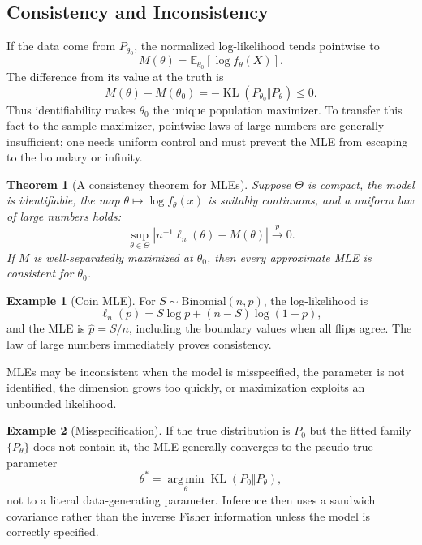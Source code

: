 \documentclass[12pt,oneside]{book}
\numberwithin{equation}{section}
\theoremstyle{definition}
\newtheorem{example}{Example}[section]
\theoremstyle{plain}
\newtheorem{theorem}{Theorem}[section]
\theoremstyle{remark}
\newcommand{\E}{\mathbb{E}}
\newcommand{\convp}{\overset{p}{\to}}
\newcommand{\argmin}{\operatorname*{arg\,min}}
\newcommand{\abs}[1]{\left\lvert #1 \right\rvert}
\newcommand{\Bin}{\mathrm{Binomial}}
\begin{document}
\subsection{Consistency and Inconsistency}

If the data come from $P_{\theta_0}$, the normalized log-likelihood tends
pointwise to
\[
    M(\theta)=\E_{\theta_0}[\log f_\theta(X)].
\]
The difference from its value at the truth is
\begin{equation}
    M(\theta)-M(\theta_0)
    =-\operatorname{KL}(P_{\theta_0}\Vert P_\theta)\leq0.
    \label{eq:mle-kl-identity}
\end{equation}
Thus identifiability makes $\theta_0$ the unique population maximizer.  To
transfer this fact to the sample maximizer, pointwise laws of large numbers
are generally insufficient; one needs uniform control and must prevent the
MLE from escaping to the boundary or infinity.

\begin{theorem}[A consistency theorem for MLEs]
Suppose $\Theta$ is compact, the model is identifiable, the map
$\theta\mapsto\log f_\theta(x)$ is suitably continuous, and a uniform law of
large numbers holds:
\[
 \sup_{\theta\in\Theta}
 \abs{n^{-1}\ell_n(\theta)-M(\theta)}\convp0.
\]
If $M$ is well-separatedly maximized at $\theta_0$, then every approximate MLE
is consistent for $\theta_0$.
\end{theorem}

\begin{example}[Coin MLE]
For $S\sim\Bin(n,p)$, the log-likelihood is
\[
    \ell_n(p)=S\log p+(n-S)\log(1-p),
\]
and the MLE is $\widehat p=S/n$, including the boundary values when all flips
agree.  The law of large numbers immediately proves consistency.
\end{example}

MLEs may be inconsistent when the model is misspecified, the parameter is not
identified, the dimension grows too quickly, or maximization exploits an
unbounded likelihood.

\begin{example}[Misspecification]
If the true distribution is $P_0$ but the fitted family
$\{P_\theta\}$ does not contain it, the MLE generally converges to the
pseudo-true parameter
\[
    \theta^*=\argmin_\theta
       \operatorname{KL}(P_0\Vert P_\theta),
\]
not to a literal data-generating parameter.  Inference then uses a sandwich
covariance rather than the inverse Fisher information unless the model is
correctly specified.
\end{example}
\end{document}
